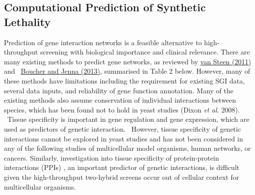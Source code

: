 \subsection[Computational Prediction of Synthetic
Lethality]{Computational Prediction of Synthetic Lethality}

Prediction of gene interaction networks is a feasible alternative to
high-throughput screening with biological importance and clinical
relevance. There are many existing methods to predict gene networks,
as reviewed by \hyperlink{ENREF104}{van Steen (2011)} and
\ \hyperlink{ENREF16}{Boucher and Jenna (2013)}, summarised in Table 2
below. However, many of these methods have limitations including the
requirement for existing SGI data, several data inputs, and reliability
of gene function annotation. Many of the existing methods also assume
conservation of individual interactions between species, which has been
found not to hold in yeast studies (Dixon\textit{ et al.} 2008).
\ Tissue specificity is important in gene regulation and gene
expression, which are used as predictors of genetic interaction.
\ However, tissue specificity of genetic interactions cannot be
explored in yeast studies and has not been considered in any of the
following studies of multicellular model organisms, human networks, or
cancers. Similarly, investigation into tissue specificity of
protein-protein interactions (PPIs) , an important predictor of genetic
interactions, is difficult given the high-throughput two-hybrid screens
occur out of cellular context for multicellular organisms. 


